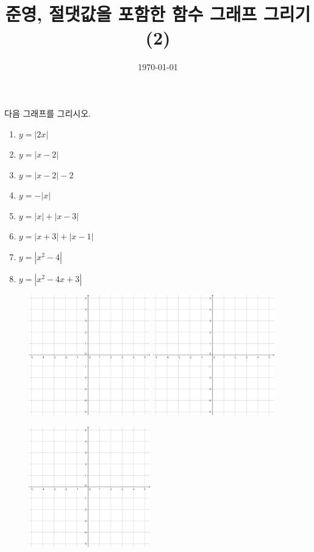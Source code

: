 \documentclass[a4paper]{oblivoir}
\title{준영, 절댓값을 포함한 함수 그래프 그리기(2)}
\date{\today}
\author{}
\newcounter{num}
\begin{document}
\maketitle

다음 그래프를 그리시오.
\begin{enumerate}[(1)]
\item
\(y=|2x|\)
\item
\(y=|x-2|\)
\item
\(y=|x-2|-2\)
\item
\(y=-|x|\)
\item
\(y=|x|+|x-3|\)
\item
\(y=|x+3|+|x-1|\)
\item
\(y=|x^2-4|\)
\item
\(y=|x^2-4x+3|\)
\end{enumerate}
\clearpage
\begin{figure}
\noindent\includegraphics[width=0.47\textwidth]{55}
\hspace{30pt}\includegraphics[width=0.47\textwidth]{55}
\par\vspace{40pt}
\noindent\includegraphics[width=0.47\textwidth]{55}

\end{figure}
\end{document}
